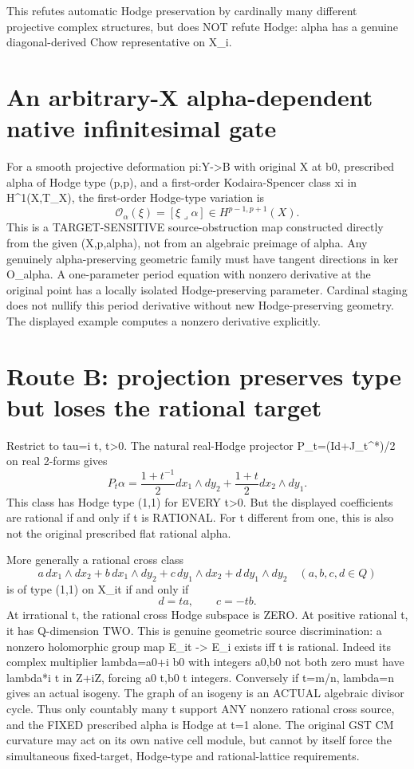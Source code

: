 \documentclass[11pt]{article}
\begin{document}
This refutes automatic Hodge preservation by cardinally many
different projective complex structures, but does NOT refute Hodge:
alpha has a genuine diagonal-derived Chow representative on X_i.

\section{An arbitrary-X alpha-dependent native infinitesimal gate}
For a smooth projective deformation pi:Y->B with original X at b0,
prescribed alpha of Hodge type (p,p), and a first-order
Kodaira-Spencer class xi in H^1(X,T_X), the first-order
Hodge-type variation is
\[
\boxed{
\mathcal O_\alpha(\xi)
=[\xi\lrcorner\alpha]\in H^{p-1,p+1}(X).}\tag{2}
\]
This is a TARGET-SENSITIVE source-obstruction map constructed directly
from the given (X,p,alpha), not from an algebraic preimage of alpha.
Any genuinely alpha-preserving geometric family must have tangent
directions in ker O_alpha. A one-parameter period equation with
nonzero derivative at the original point has a locally isolated
Hodge-preserving parameter. Cardinal staging does not nullify
this period derivative without new Hodge-preserving geometry.
The displayed example computes a nonzero derivative explicitly.

\section{Route B: projection preserves type but loses the rational target}
Restrict to tau=i t, t>0. The natural real-Hodge projector
P_t=(Id+J_t^*)/2 on real 2-forms gives
\[
\boxed{
P_t\alpha=
\frac{1+t^{-1}}2 dx_1\wedge dy_2
+\frac{1+t}2 dx_2\wedge dy_1.}\tag{3}
\]
This class has Hodge type (1,1) for EVERY t>0. But the displayed
coefficients are rational if and only if t is RATIONAL.
For t different from one, this is also not the original
prescribed flat rational alpha.

More generally a rational cross class
\[
a\,dx_1\wedge dx_2+b\,dx_1\wedge dy_2+
c\,dy_1\wedge dx_2+d\,dy_1\wedge dy_2
\quad(a,b,c,d\in Q)
\]
is of type (1,1) on X_it if and only if
\[
\boxed{d=t a,\qquad c=-t b.}\tag{4}
\]
At irrational t, the rational cross Hodge subspace is ZERO.
At positive rational t, it has Q-dimension TWO.
This is genuine geometric source discrimination:
a nonzero holomorphic group map E_it -> E_i exists iff
t is rational. Indeed its complex multiplier
lambda=a0+i b0 with integers a0,b0 not both zero
must have lambda*i t in Z+iZ, forcing
a0 t,b0 t integers. Conversely if t=m/n,
lambda=n gives an actual isogeny. The graph of
an isogeny is an ACTUAL algebraic divisor cycle.
Thus only countably many t support ANY nonzero
rational cross source, and the FIXED prescribed
alpha is Hodge at t=1 alone.
The original GST CM curvature may act on its own
native cell module, but cannot by itself force
the simultaneous fixed-target, Hodge-type
and rational-lattice requirements.
\end{document}
